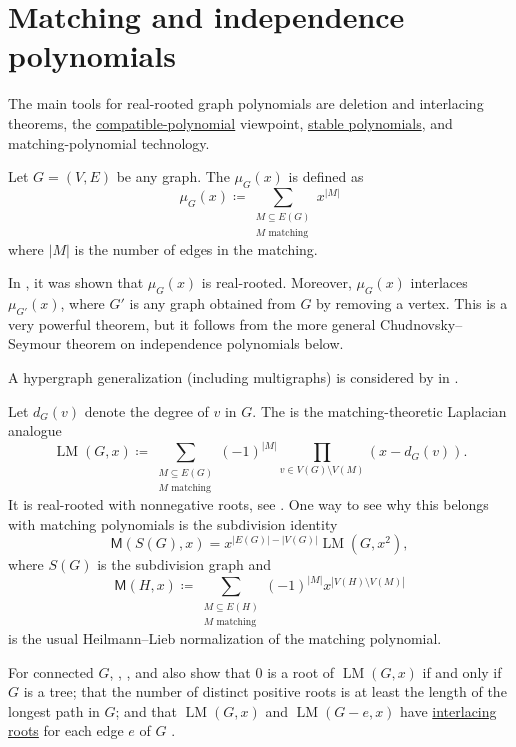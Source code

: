 


\section[realRootedMatching]{Matching and independence polynomials}

The main tools for real-rooted graph polynomials are deletion and
interlacing theorems, the
\hyperref[compatiblePolynomials]{compatible-polynomial} viewpoint,
\hyperref[stablePolynomial]{stable polynomials}, and matching-polynomial
technology.

Let $G = (V,E)$ be any graph.
The \label{matchingPolynomial} $\mu_G(x)$ is
defined as
\[
\mu_G(x) \coloneqq \sum_{\substack{M \subseteq E(G) \\ \text{$M$ matching}}} x^{|M|}
\]
where $|M|$ is the number of edges in the matching.

In \cite[Thm.~4.2]{HeilmannLieb1972}, it was shown that $\mu_G(x)$
is real-rooted. Moreover, $\mu_G(x)$ interlaces $\mu_{G'}(x)$, where $G'$
is any graph obtained from $G$ by removing a vertex.
This is a very powerful theorem, but it follows
from the more general Chudnovsky--Seymour theorem on independence polynomials below.

A hypergraph generalization (including multigraphs)
is considered by  in \cite{Amini2019x}.


\begin{example*}
Let $d_G(v)$ denote the degree of $v$ in $G$.
The \label{laplacianMatchingPolynomial}
is the matching-theoretic Laplacian analogue
\[
 \operatorname{LM}(G,x) \coloneqq
 \sum_{\substack{M \subseteq E(G) \\ \text{$M$ matching}}}
 (-1)^{|M|}
 \prod_{v\in V(G)\setminus V(M)} (x-d_G(v)).
\]
It is real-rooted with nonnegative roots, see \cite{WanWangMohammadian2022}.
One way to see why this belongs with matching polynomials is the subdivision identity
\[
 \mathsf{M}(S(G),x)=x^{|E(G)|-|V(G)|}\operatorname{LM}(G,x^2),
\]
where $S(G)$ is the subdivision graph and
\[
 \mathsf{M}(H,x) \coloneqq
 \sum_{\substack{M \subseteq E(H) \\ \text{$M$ matching}}}
 (-1)^{|M|}x^{|V(H)\setminus V(M)|}
\]
is the usual Heilmann--Lieb normalization of the matching polynomial.

For connected $G$, , , and
 also show that $0$ is a root of
$\operatorname{LM}(G,x)$ if and only if $G$ is a tree; that the number of
distinct positive roots is at least the length of the longest path in $G$; and
that $\operatorname{LM}(G,x)$ and $\operatorname{LM}(G-e,x)$ have
\hyperref[interlacingPolynomials]{interlacing roots} for each edge $e$ of $G$
\cite{WanWangMohammadian2022}.
\end{example*}


